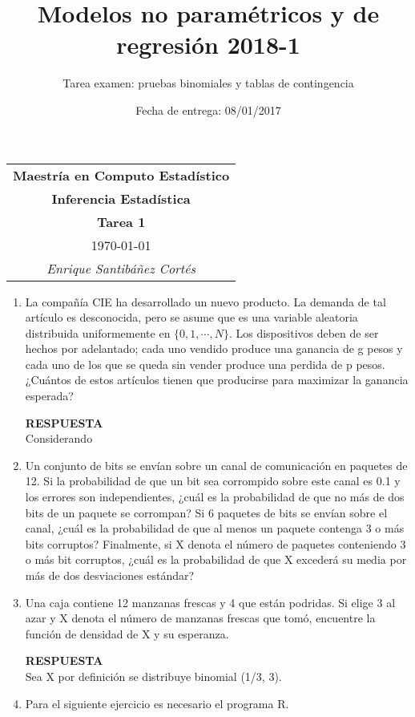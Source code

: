 \documentclass[11pt,letterpaper]{article}
\title{Modelos no paramétricos y de regresión 2018-1}
\author{Tarea examen: pruebas binomiales y tablas de contingencia}
\date{Fecha de entrega: 08/01/2017}
\newcommand{\res}{\textbf{RESPUESTA}\\}
\begin{document}
\begin{table}[ht]
\centering
\begin{tabular}{c}
\textbf{Maestría en Computo Estadístico}\\
\textbf{Inferencia Estadística} \\
\textbf{Tarea 1}\\
\today \\
\emph{Enrique Santibáñez Cortés}
\end{tabular}
\end{table}

\begin{enumerate}

\item La compañía CIE ha desarrollado un nuevo producto. La demanda de tal artículo es desconocida, pero se asume que es una variable aleatoria distribuida uniformemente en $\{0, 1, \cdots, N \}$.
Los dispositivos deben de ser hechos por adelantado; cada uno vendido produce una ganancia de g pesos y cada uno de los que se queda sin vender produce una perdida de p pesos.
¿Cuántos de estos artículos tienen que producirse para maximizar la ganancia esperada?

\res

Considerando

\item Un conjunto de bits se envían sobre un canal de comunicación en paquetes de 12. Si la probabilidad de que un bit sea corrompido sobre este canal es 0.1 y los errores son independientes,
¿cuál es la probabilidad de que no más de dos bits de un paquete se corrompan? Si 6 paquetes
de bits se envían sobre el canal, ¿cuál es la probabilidad de que al menos un paquete contenga 3 o más bits corruptos? Finalmente, si X denota el número de paquetes conteniendo
3 o más bit corruptos, ¿cuál es la probabilidad de que X excederá su media por más de dos
desviaciones estándar? 

\item Una caja contiene 12 manzanas frescas y 4 que están podridas. Si elige 3 al azar y X denota el
número de manzanas frescas que tomó, encuentre la función de densidad de X y su esperanza.

\res 

Sea X por definición se distribuye binomial (1/3, 3).

\item Para el siguiente ejercicio es necesario el programa \textsc{R}.

\begin{itemize}


\end{itemize}
\end{enumerate}
\end{document}

